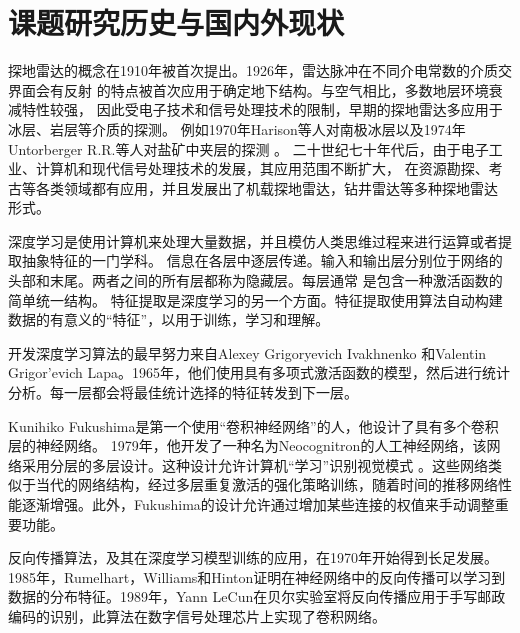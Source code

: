 \section{课题研究历史与国内外现状}
探地雷达的概念在1910年被首次提出。1926年，雷达脉冲在不同介电常数的介质交界面会有反射
的特点被首次应用于确定地下结构。与空气相比，多数地层环境衰减特性较强，
因此受电子技术和信号处理技术的限制，早期的探地雷达多应用于冰层、岩层等介质的探测。
例如1970年Harison等人对南极冰层以及1974年Untorberger R.R.等人对盐矿中夹层的探测
。
二十世纪七十年代后，由于电子工业、计算机和现代信号处理技术的发展，其应用范围不断扩大，
在资源勘探、考古等各类领域都有应用，并且发展出了机载探地雷达，钻井雷达等多种探地雷达
形式。

深度学习是使用计算机来处理大量数据，并且模仿人类思维过程来进行运算或者提取抽象特征的一门学科。
信息在各层中逐层传递。输入和输出层分别位于网络的头部和末尾。两者之间的所有层都称为隐藏层。每层通常
是包含一种激活函数的简单统一结构。
特征提取是深度学习的另一个方面。特征提取使用算法自动构建数据的有意义的“特征”，以用于训练，学习和理解。


开发深度学习算法的最早努力来自Alexey Grigoryevich Ivakhnenko 和Valentin Grigor'evich Lapa。1965年，他们使用具有多项式激活函数的模型，然后进行统计分析。每一层都会将最佳统计选择的特征转发到下一层。

Kunihiko Fukushima是第一个使用“卷积神经网络”的人，他设计了具有多个卷积层的神经网络。 1979年，他开发了一种名为Neocognitron的人工神经网络，该网络采用分层的多层设计。这种设计允许计算机“学习”识别视觉模式
。这些网络类似于当代的网络结构，经过多层重复激活的强化策略训练，随着时间的推移网络性能逐渐增强。此外，Fukushima的设计允许通过增加某些连接的权值来手动调整重要功能。

反向传播算法，及其在深度学习模型训练的应用，在1970年开始得到长足发展。1985年，Rumelhart，Williams和Hinton证明在神经网络中的反向传播可以学习到数据的分布特征。1989年，Yann LeCun在贝尔实验室将反向传播应用于手写邮政编码的识别，此算法在数字信号处理芯片上实现了卷积网络。

